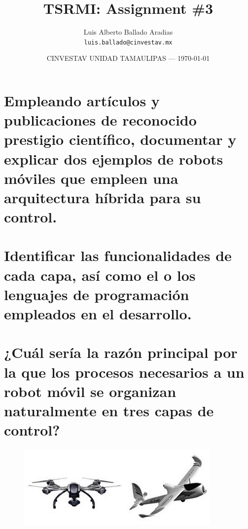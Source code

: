 \documentclass{article}
\title{TSRMI: Assignment \#3} %
\author{Luis Alberto Ballado Aradias\\ \texttt{luis.ballado@cinvestav.mx}} %
\date{CINVESTAV UNIDAD TAMAULIPAS --- \today} %
\begin{document}
\maketitle %


\section*{Empleando artículos y publicaciones de reconocido prestigio científico, documentar y explicar dos ejemplos de robots móviles que empleen una arquitectura híbrida para su control.}

\section*{Identificar las funcionalidades de cada capa, así como el o los lenguajes de programación empleados en el desarrollo.}

\section*{¿Cuál sería la razón principal por la que los procesos necesarios a un robot móvil se organizan naturalmente en tres capas de control?}

\begin{figure}[h]
\includegraphics[width=10cm]{images/vant.jpg}
\centering
\end{figure}
\end{document}
